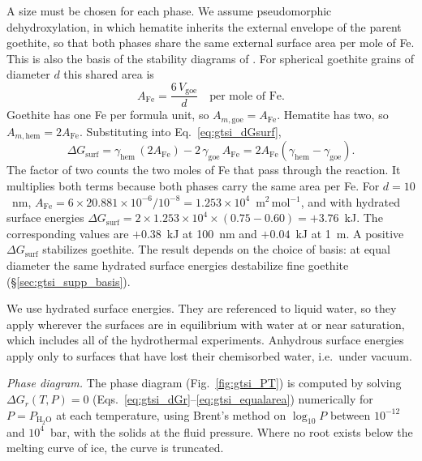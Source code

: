 A size must be chosen for each phase. We assume pseudomorphic dehydroxylation, in which hematite
inherits the external envelope of the parent goethite, so that both phases share the same
external surface area per mole of Fe. This is also the basis of the stability diagrams of
\citet{navrotsky2008}. For spherical goethite grains of diameter $d$ this shared area is
\begin{equation}
  A_{\mathrm{Fe}} = \frac{6\,V_{\mathrm{goe}}}{d}\quad\text{per mole of Fe}.
\end{equation}
Goethite has one Fe per formula unit, so $A_{m,\mathrm{goe}} = A_{\mathrm{Fe}}$. Hematite has two,
so $A_{m,\mathrm{hem}} = 2A_{\mathrm{Fe}}$. Substituting into Eq.~\eqref{eq:gtsi_dGsurf},
\begin{equation}
  \Delta G_{\mathrm{surf}} = \gamma_{\mathrm{hem}}\,(2A_{\mathrm{Fe}}) - 2\,\gamma_{\mathrm{goe}}\,A_{\mathrm{Fe}}
  = 2A_{\mathrm{Fe}}\left(\gamma_{\mathrm{hem}} - \gamma_{\mathrm{goe}}\right).
  \label{eq:gtsi_equalarea}
\end{equation}
The factor of two counts the two moles of Fe that pass through the reaction. It multiplies both
terms because both phases carry the same area per Fe. For $d=10$~nm,
$A_{\mathrm{Fe}} = 6\times20.881\times10^{-6}/10^{-8} = 1.253\times10^{4}$~m$^2$\,mol$^{-1}$, and
with hydrated surface energies
$\Delta G_{\mathrm{surf}} = 2\times1.253\times10^{4}\times(0.75-0.60) = +3.76$~kJ.
The corresponding values are $+0.38$~kJ at 100~nm and $+0.04$~kJ at 1~\textmu m. A positive
$\Delta G_{\mathrm{surf}}$ stabilizes goethite. The result depends on the choice of basis: at
equal diameter the same hydrated surface energies destabilize fine goethite
(\S\ref{sec:gtsi_supp_basis}).

We use hydrated surface energies. They are referenced to liquid water, so they apply wherever the
surfaces are in equilibrium with water at or near saturation, which includes all of the
hydrothermal experiments. Anhydrous surface energies apply only to surfaces that have lost their
chemisorbed water, i.e.\ under vacuum.

\textit{Phase diagram.} The phase diagram (Fig.~\ref{fig:gtsi_PT}) is computed by solving
$\Delta G_r(T,P) = 0$ (Eqs.~\eqref{eq:gtsi_dGr}--\eqref{eq:gtsi_equalarea}) numerically for
$P = P_{\mathrm{H_2O}}$ at each temperature, using Brent's method on $\log_{10}P$ between
$10^{-12}$ and $10^{4}$~bar, with the solids at the fluid pressure. Where no root exists below the
melting curve of ice, the curve is truncated.


